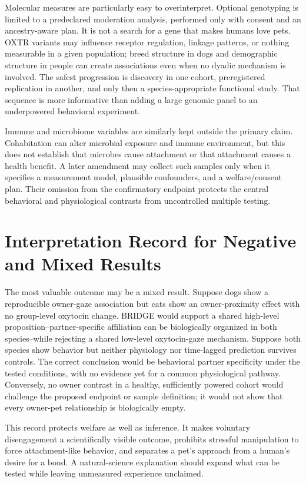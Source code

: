 \documentclass[conference]{IEEEtran}
\begin{document}
Molecular measures are particularly easy to overinterpret. Optional genotyping is limited to a predeclared moderation analysis, performed only with consent and an ancestry-aware plan. It is not a search for a gene that makes humans love pets. OXTR variants may influence receptor regulation, linkage patterns, or nothing measurable in a given population; breed structure in dogs and demographic structure in people can create associations even when no dyadic mechanism is involved. The safest progression is discovery in one cohort, preregistered replication in another, and only then a species-appropriate functional study. That sequence is more informative than adding a large genomic panel to an underpowered behavioral experiment.

Immune and microbiome variables are similarly kept outside the primary claim. Cohabitation can alter microbial exposure and immune environment, but this does not establish that microbes cause attachment or that attachment causes a health benefit. A later amendment may collect such samples only when it specifies a measurement model, plausible confounders, and a welfare/consent plan. Their omission from the confirmatory endpoint protects the central behavioral and physiological contrasts from uncontrolled multiple testing.

\section{Interpretation Record for Negative and Mixed Results}

The most valuable outcome may be a mixed result. Suppose dogs show a reproducible owner-gaze association but cats show an owner-proximity effect with no group-level oxytocin change. BRIDGE would support a shared high-level proposition--partner-specific affiliation can be biologically organized in both species--while rejecting a shared low-level oxytocin-gaze mechanism. Suppose both species show behavior but neither physiology nor time-lagged prediction survives controls. The correct conclusion would be behavioral partner specificity under the tested conditions, with no evidence yet for a common physiological pathway. Conversely, no owner contrast in a healthy, sufficiently powered cohort would challenge the proposed endpoint or sample definition; it would not show that every owner-pet relationship is biologically empty.

This record protects welfare as well as inference. It makes voluntary disengagement a scientifically visible outcome, prohibits stressful manipulation to force attachment-like behavior, and separates a pet's approach from a human's desire for a bond. A natural-science explanation should expand what can be tested while leaving unmeasured experience unclaimed.
\end{document}

